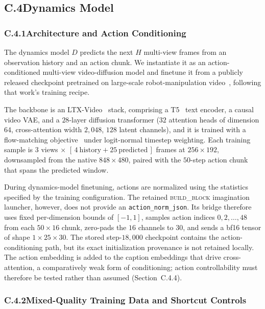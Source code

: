 \documentclass[letterpaper]{article} %
\begin{document}
\subsection{C.4\quad Dynamics Model}

\subsubsection{C.4.1\quad Architecture and Action Conditioning}

The dynamics model $D$ predicts the next $H$ multi-view frames from an
observation history and an action chunk. We instantiate it as an
action-conditioned multi-view video-diffusion model and finetune it from a
publicly released checkpoint pretrained on large-scale robot-manipulation
video~\cite{yang2026rise}, following that work's training recipe.

The backbone is an LTX-Video~\cite{hacohen2025ltxvideo} stack, comprising a T5~\cite{raffel2020t5} text encoder, a causal video VAE, and a
$28$-layer diffusion transformer ($32$ attention heads of dimension $64$,
cross-attention width $2{,}048$, $128$ latent channels), and it is trained with a flow-matching
objective~\cite{lipman2023flowmatching} under logit-normal timestep weighting. Each training sample is
$3$ views $\times$ $[\,4\ \text{history} + 25\ \text{predicted}\,]$ frames at
$256{\times}192$, downsampled from the native $848{\times}480$, paired with the
$50$-step action chunk that spans the predicted window.

During dynamics-model finetuning, actions are normalized using the statistics
specified by the training configuration. The retained \textsc{build\_block}
imagination launcher, however, does not provide an
\texttt{action\_norm\_json}. Its bridge therefore uses fixed per-dimension
bounds of $[-1,1]$, samples action indices $0,2,\ldots,48$ from each
$50\times16$ chunk, zero-pads the $16$ channels to $30$, and sends a bf16 tensor
of shape $1\times25\times30$. The stored step-$18{,}000$ checkpoint contains
the action-conditioning path, but its exact initialization provenance is not
retained locally. The action embedding is added to the caption embeddings that
drive cross-attention, a comparatively weak form of conditioning; action
controllability must therefore be tested rather than assumed
(Section~C.4.4).

\subsubsection{C.4.2\quad Mixed-Quality Training Data and Shortcut Controls}
\end{document}
